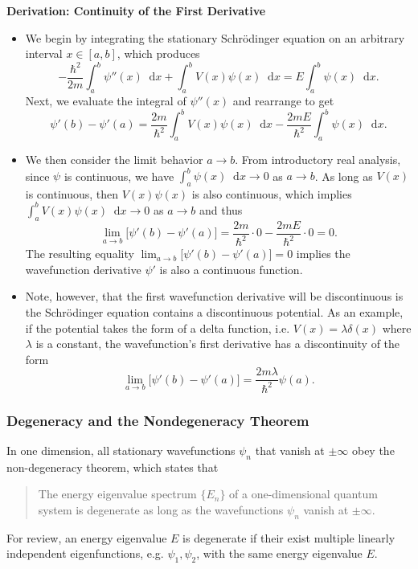 \documentclass[11pt, a4paper]{article}
\newcommand{\diff}{\mathop{}\!\mathrm{d}} %
\newcommand{\Schro}{Schr\"{o}dinger\xspace}
\newcommand{\p}{\psi}  %
\begin{document}
 \textbf{Derivation: Continuity of the First Derivative}
 \begin{itemize}
     \item We begin by integrating the stationary \Schro equation on an arbitrary interval $ x \in [a, b] $, which produces
	\begin{equation*}
		-\frac{\hbar^{2}}{2m}\int_{a}^{b}\p''(x) \diff x + \int_{a}^{b}V(x)\p(x)\diff x = E \int_{a}^{b}\p (x) \diff x.
	\end{equation*}
	Next, we evaluate the integral of $ \psi''(x) $ and rearrange to get
	\begin{equation*}
		\psi'(b) - \psi'(a) = \frac{2m}{\hbar^{2}}\int_{a}^{b}V(x) \p(x) \diff x - \frac{2mE}{\hbar^{2}}\int_{a}^{b}\p(x)\diff x.
	\end{equation*}
    
     \item We then consider the limit behavior $ a \to b $. From introductory real analysis, since $ \p $ is continuous, we have $ \int_{a}^{b}\p(x)\diff x \to 0 $ as $ a \to b $. As long as $ V(x) $ is continuous, then $ V(x)\p(x) $ is also continuous, which implies $ \int_{a}^{b}V(x)\p(x)\diff x \to 0 $ as $ a \to b $ and thus
	\begin{equation*}
		\lim_{a \to b} \big[\psi'(b) - \psi'(a)\big] = \frac{2m}{\hbar^{2}} \cdot 0 - \frac{2mE}{\hbar^{2}} \cdot 0 = 0.
	\end{equation*}
	The resulting equality $ \lim_{a \to b} \big[\psi'(b) - \psi'(a)\big] = 0 $ implies the wavefunction derivative $ \psi' $ is also a continuous function.
	
     \item  Note, however, that the first wavefunction derivative will be discontinuous is the \Schro equation contains a discontinuous potential. As an example, if the potential takes the form of a delta function, i.e. $ V(x) = \lambda \delta (x) $ where $ \lambda $ is a constant, the wavefunction's first  derivative has a discontinuity of the form
	\begin{equation*}
		\lim_{a \to b} \big[\psi'(b) - \psi'(a)\big] = \frac{2m\lambda}{\hbar^{2}}\psi(a).
	\end{equation*}
\end{itemize}


\subsubsection{Degeneracy and the Nondegeneracy Theorem}
In one dimension, all stationary wavefunctions $ \psi_{n} $ that vanish at $ \pm \infty $ obey the non-degeneracy theorem, which states that
\begin{quote}
    The energy eigenvalue spectrum $ \{E_{n}\} $ of a one-dimensional quantum system is degenerate as long as the wavefunctions $ \psi_{n} $ vanish at $ \pm \infty $. 
\end{quote} 
For review, an energy eigenvalue $ E $ is degenerate if their exist multiple linearly independent eigenfunctions, e.g. $ \psi_{1}, \psi_{2} $, with the same energy eigenvalue $ E $. 
\end{document}
